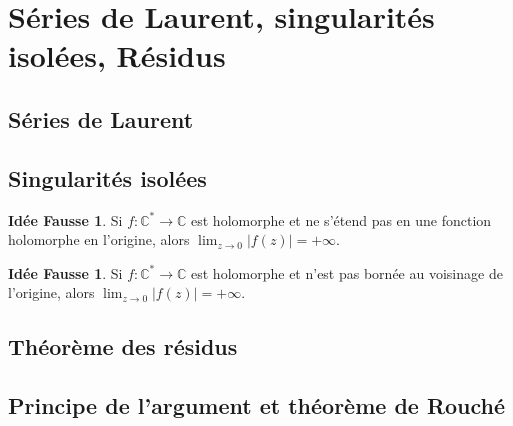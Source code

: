 \documentclass[11pt,a4paper]{article}
\newcommand{\C}{\mathbb{C}}
\theoremstyle{definition}
\newtheorem{ideeFausse}[theoreme]{Idée Fausse}
\theoremstyle{plain}
\begin{document}
\section{Séries de Laurent, singularités isolées, Résidus}

\subsection{Séries de Laurent}
%
%
%


\subsection{Singularités isolées}

\begin{ideeFausse}
Si $f : \C^* \to \C$ est holomorphe et ne s'étend pas en une fonction holomorphe en l'origine, alors $\lim_{z\to 0} |f(z)| = +\infty$.
\end{ideeFausse}

\begin{ideeFausse}
Si $f : \C^* \to \C$ est holomorphe et n'est pas bornée au voisinage de l'origine, alors $\lim_{z\to 0} |f(z)| = +\infty$.
\end{ideeFausse}

%


\subsection{Théorème des résidus}

%
%



\subsection{Principe de l'argument et théorème de Rouché}
%
%
%
\end{document}
